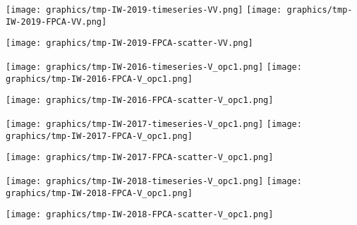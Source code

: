 
\begin{center}
\begin{minipage}{7.0in}
\texttt{[image: graphics/tmp-IW-2019-timeseries-VV.png]}
\quad
\texttt{[image: graphics/tmp-IW-2019-FPCA-VV.png]}
\vskip 1.0cm
\begin{center}
\texttt{[image: graphics/tmp-IW-2019-FPCA-scatter-VV.png]}
\end{center}
\end{minipage}
\end{center}


\begin{center}
\begin{minipage}{7.0in}
\texttt{[image: graphics/tmp-IW-2016-timeseries-V\_opc1.png]}
\quad
\texttt{[image: graphics/tmp-IW-2016-FPCA-V\_opc1.png]}
\vskip 1.0cm
\begin{center}
\texttt{[image: graphics/tmp-IW-2016-FPCA-scatter-V\_opc1.png]}
\end{center}
\end{minipage}
\end{center}


\begin{center}
\begin{minipage}{7.0in}
\texttt{[image: graphics/tmp-IW-2017-timeseries-V\_opc1.png]}
\quad
\texttt{[image: graphics/tmp-IW-2017-FPCA-V\_opc1.png]}
\vskip 1.0cm
\begin{center}
\texttt{[image: graphics/tmp-IW-2017-FPCA-scatter-V\_opc1.png]}
\end{center}
\end{minipage}
\end{center}


\begin{center}
\begin{minipage}{7.0in}
\texttt{[image: graphics/tmp-IW-2018-timeseries-V\_opc1.png]}
\quad
\texttt{[image: graphics/tmp-IW-2018-FPCA-V\_opc1.png]}
\vskip 1.0cm
\begin{center}
\texttt{[image: graphics/tmp-IW-2018-FPCA-scatter-V\_opc1.png]}
\end{center}
\end{minipage}
\end{center}

